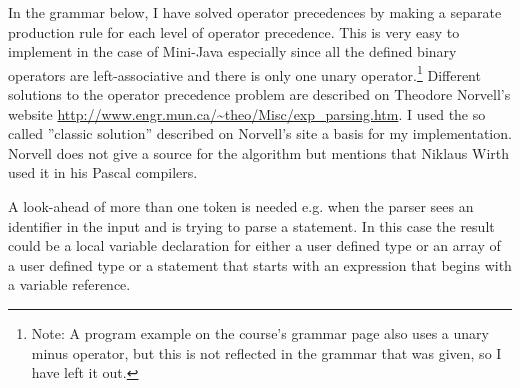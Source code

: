 \documentclass[a4paper,11pt]{article}
\begin{document}
In the grammar below, I have solved operator precedences by making a separate production rule for each level of operator precedence. This is very easy to implement in the case of Mini-Java especially since all the defined binary operators are left-associative and there is only one unary operator.\footnote{Note: A program example on the course's grammar page also uses a unary minus operator, but this is not reflected in the grammar that was given, so I have left it out.} Different solutions to the operator precedence problem are described on Theodore Norvell's website \url{http://www.engr.mun.ca/~theo/Misc/exp_parsing.htm}. I used the so called ''classic solution'' described on Norvell's site a basis for my implementation. Norvell does not give a source for the algorithm but mentions that Niklaus Wirth used it in his Pascal compilers. 

A look-ahead of more than one token is needed e.g. when the parser sees an identifier in the input and is trying to parse a statement. In this case the result could be a local variable declaration for either a user defined type or an array of a user defined type or a statement that starts with an expression that begins with a variable reference.
\end{document}
